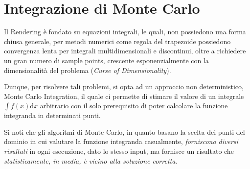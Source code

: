 \chapter{Integrazione di Monte Carlo}\label{chapter6}
Il Rendering \`e fondato su equazioni integrali, le quali, non possiedono una forma chiusa generale, per metodi numerici come regola del trapezoide
possiedono convergenza lenta per integrali multidimensionali e discontinui, oltre a richiedere un gran numero di sample points, crescente 
esponenzialmente con la dimensionalit\`a del problema (\textit{Curse of Dimensionality}).\par
Dunque, per risolvere tali problemi, si opta ad un approccio non deterministico, Monte Carlo Integration, il quale ci permette di stimare il valore 
di un integrale $\int f(x)\mathrm{d}x$ arbitrario con il solo prerequisito di poter calcolare la funzione integranda in determinati punti.\par
Si noti che gli algoritmi di Monte Carlo, in quanto basano la scelta dei punti del dominio in cui valutare la funzione integranda casualmente, 
\textit{forniscono diversi risultati} in ogni esecuzione, dato lo stesso input, ma fornisce un risultato che \textit{statisticamente, in media, 
\`e vicino alla soluzione corretta}\footnotemark{}.
